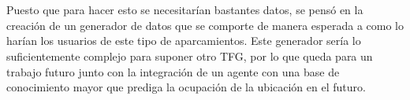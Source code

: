 \\\\
Puesto que para hacer esto se necesitarían bastantes datos, se pensó en la creación de un generador de datos que se comporte de manera esperada a como lo harían los usuarios de este tipo de aparcamientos. Este generador sería lo suficientemente complejo para suponer otro TFG, por lo que queda para un trabajo futuro junto con la integración de un agente con una base de conocimiento mayor que prediga la ocupación de la ubicación en el futuro.